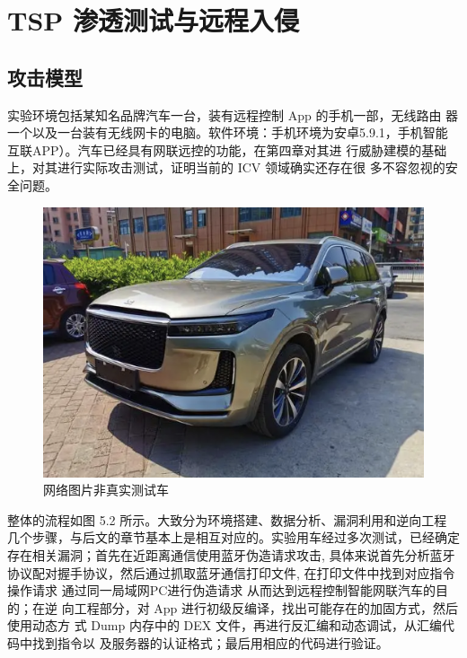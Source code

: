 \chapter{TSP 渗透测试与远程入侵}
\label{ch5}
\section{攻击模型}
实验环境包括某知名品牌汽车一台，装有远程控制 App 的手机一部，无线路由
器一个以及一台装有无线网卡的电脑。软件环境：手机环境为安卓5.9.1，手机智能互联APP）。汽车已经具有网联远控的功能，在第四章对其进
行威胁建模的基础上，对其进行实际攻击测试，证明当前的 ICV 领域确实还存在很
多不容忽视的安全问题。
\begin{figure}
    \centering
    \includegraphics[scale=0.5]{resources/img/i14.png}
    \caption{网络图片非真实测试车}
  \end{figure}
\newline
整体的流程如图 5.2 所示。大致分为环境搭建、数据分析、漏洞利用和逆向工程
几个步骤，与后文的章节基本上是相互对应的。实验用车经过多次测试，已经确定
存在相关漏洞；首先在近距离通信使用蓝牙伪造请求攻击, 具体来说首先分析蓝牙协议配对握手协议，然后通过抓取蓝牙通信打印文件, 在打印文件中找到对应指令操作请求
通过同一局域网PC进行伪造请求 从而达到远程控制智能网联汽车的目的；在逆
向工程部分，对 App 进行初级反编译，找出可能存在的加固方式，然后使用动态方
式 Dump 内存中的 DEX 文件，再进行反汇编和动态调试，从汇编代码中找到指令以
及服务器的认证格式；最后用相应的代码进行验证。
